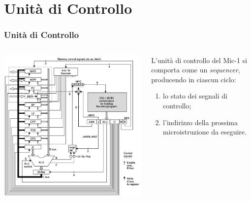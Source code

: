 \documentclass{beamer}
\begin{document}
\section{Unità di Controllo}
\begin{frame}
  \frametitle{Unità di Controllo}
  \begin{columns}
    \begin{column}{0.6\textwidth}
      \begin{center}
        \includegraphics[width=\textwidth]{mic1.png}
      \end{center}
    \end{column}
    \begin{column}{0.4\textwidth}
      L'unità di controllo del Mic-1 si comporta come un \textit{sequencer},
      producendo in ciascun ciclo:
\begin{enumerate}
  \item lo stato dei segnali di controllo;
  \item l'indirizzo della prossima microistruzione da eseguire.
\end{enumerate}
    \end{column}
  \end{columns}
\end{frame}
\end{document}
